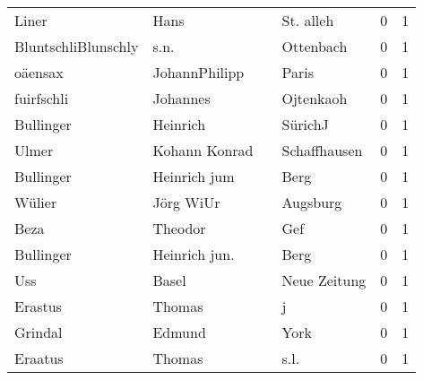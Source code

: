 \begin{tabular}{llllrr}
                    Liner &                               Hans &             &                                   St. alleh &          0 &         1 \\
      BluntschliBlunschly &                               s.n. &             &                                   Ottenbach &          0 &         1 \\
                  oäensax &                      JohannPhilipp &             &                                       Paris &          0 &         1 \\
               fuirfschli &                           Johannes &             &                                   Ojtenkaoh &          0 &         1 \\
                Bullinger &                           Heinrich &             &                                     SürichJ &          0 &         1 \\
                    Ulmer &                      Kohann Konrad &             &                                Schaffhausen &          0 &         1 \\
                Bullinger &                       Heinrich jum &             &                                        Berg &          0 &         1 \\
                   Wülier &                          Jörg WiUr &             &                                    Augsburg &          0 &         1 \\
                     Beza &                            Theodor &             &                                         Gef &          0 &         1 \\
                Bullinger &                      Heinrich jun. &             &                                        Berg &          0 &         1 \\
                      Uss &                              Basel &             &                                Neue Zeitung &          0 &         1 \\
                  Erastus &                             Thomas &             &                                           j &          0 &         1 \\
                  Grindal &                             Edmund &             &                                        York &          0 &         1 \\
                  Eraatus &                             Thomas &             &                                        s.l. &          0 &         1 \\

\end{tabular}
